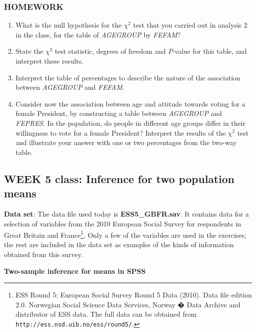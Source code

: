 \documentclass[11pt,a4paper,openany]{book}
\let\rmarkdownfootnote\footnote%
\def\footnote{\protect\rmarkdownfootnote}
\begin{document}
\subsubsection*{HOMEWORK}\label{homework-2}

\begin{enumerate}
\def\labelenumi{\arabic{enumi}.}
\item
  What is the null hypothesis for the \(\chi^{2}\) test that you carried
  out in analysis 2 in the class, for the table of \emph{AGEGROUP} by
  \emph{FEFAM}?
\item
  State the \(\chi^{2}\) test statistic, degrees of freedom and
  \(P\)-value for this table, and interpret these results.
\item
  Interpret the table of percentages to describe the nature of the
  association between \emph{AGEGROUP} and \emph{FEFAM}.
\item
  Consider now the association between age and attitude towards voting
  for a female President, by constructing a table between
  \emph{AGEGROUP} and \emph{FEPRES}. In the population, do people in
  different age groups differ in their willingness to vote for a female
  President? Interpret the results of the \(\chi^{2}\) test and
  illustrate your answer with one or two percentages from the two-way
  table.
\end{enumerate}

\newpage

\subsection{WEEK 5 class: Inference for two population
means}\label{week-5-class-inference-for-two-population-means}

\textbf{Data set}: The data file used today is \textbf{ESS5\_GBFR.sav}.
It contains data for a selection of variables from the 2010 European
Social Survey for respondents in Great Britain and France\footnote{ESS
  Round 5: European Social Survey Round 5 Data (2010). Data file edition
  2.0. Norwegian Social Science Data Services, Norway � Data Archive and
  distributor of ESS data. The full data can be obtained from
  \texttt{http://ess.nsd.uib.no/ess/round5/}.}. Only a few of the
variables are used in the exercises; the rest are included in the data
set as examples of the kinds of information obtained from this survey.

\textbf{Two-sample inference for means in SPSS}
\end{document}
